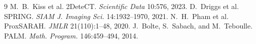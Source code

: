 \documentclass[11pt]{article}
\begin{document}

\begingroup\small
\begin{thebibliography}{9}\setlength{\itemsep}{0pt}
 M.~B.~Kiss et al. 2DeteCT. \emph{Scientific Data} 10:576, 2023.
 D.~Driggs et al. SPRING. \emph{SIAM J. Imaging Sci.} 14:1932--1970, 2021.
 N.~H.~Pham et al. ProxSARAH. \emph{JMLR} 21(110):1--48, 2020.
 J.~Bolte, S.~Sabach, and M.~Teboulle. PALM. \emph{Math. Program.} 146:459--494, 2014.
\end{thebibliography}\endgroup
\end{document}

